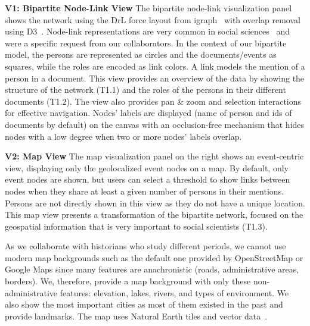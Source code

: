 \noindent\textbf{V1: Bipartite Node-Link View}
The bipartite node-link visualization panel shows the network using the DrL force layout from igraph~\cite{igraph} with overlap removal using D3~\cite{d3}.
Node-link representations are very common in social sciences~\cite{Gephi, mrvarAnalysisVisualizationLarge2016, NodeXL, cristofoliPrincipesUsagesDessins} and were a specific request from our collaborators.
In the context of our bipartite model, the persons are represented as circles and the documents/events as squares, while the roles are encoded as link colors.
A link models the mention of a person in a document.
This view provides an overview of the data by showing the structure of the network (T1.1) and the roles of the persons in their different documents (T1.2).
The view also provides pan \& zoom and selection interactions for effective navigation.
Nodes' labels are displayed (name of person and ids of documents by default) on the canvas with an occlusion-free mechanism that hides nodes with a low degree when two or more nodes' labels overlap.


\noindent\textbf{V2: Map View}
The map visualization panel on the right shows an event-centric view, displaying only the geolocalized event nodes on a map.
By default, only event nodes are shown, but users can select a threshold to show links between nodes when they share at least a given number of persons in their mentions.
Persons are not directly shown in this view as they do not have a unique location.
This map view presents a transformation of the bipartite network, focused on the geospatial information that is very important to social scientists (T1.3).

As we collaborate with historians who study different periods, we cannot use modern map backgrounds such as the default one provided by OpenStreetMap or Google Maps since many features are anachronistic (\eg roads, administrative areas, borders). We, therefore, provide a map background with only these non-administrative features: elevation, lakes, rivers, and types of environment.
We also show the most important cities as most of them existed in the past and provide landmarks.
The map uses Natural Earth tiles and vector data~\cite{NaturalEarth}.

